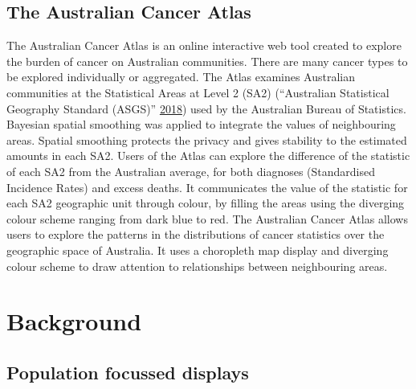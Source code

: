 \documentclass[conference,final,]{IEEEtran}
\begin{document}
\hypertarget{the-australian-cancer-atlas}{%
\subsection{The Australian Cancer Atlas}\label{the-australian-cancer-atlas}}

The Australian Cancer Atlas is an online interactive web tool created to explore the burden of cancer on Australian communities. There are many cancer types to be explored individually or aggregated.
The Atlas examines Australian communities at the Statistical Areas at Level 2 (SA2) (``Australian Statistical Geography Standard (ASGS)'' \protect\hyperlink{ref-abs2016}{2018}) used by the Australian Bureau of Statistics. Bayesian spatial smoothing was applied to integrate the values of neighbouring areas. Spatial smoothing protects the privacy and gives stability to the estimated amounts in each SA2. Users of the Atlas can explore the difference of the statistic of each SA2 from the Australian average, for both diagnoses (Standardised Incidence Rates) and excess deaths. It communicates the value of the statistic for each SA2 geographic unit through colour, by filling the areas using the diverging colour scheme ranging from dark blue to red.
The Australian Cancer Atlas allows users to explore the patterns in the distributions of cancer statistics over the geographic space of Australia. It uses a choropleth map display and diverging colour scheme to draw attention to relationships between neighbouring areas.

\hypertarget{background}{%
\section{Background}\label{background}}

\hypertarget{population-focussed-displays}{%
\subsection{Population focussed displays}\label{population-focussed-displays}}
\end{document}
